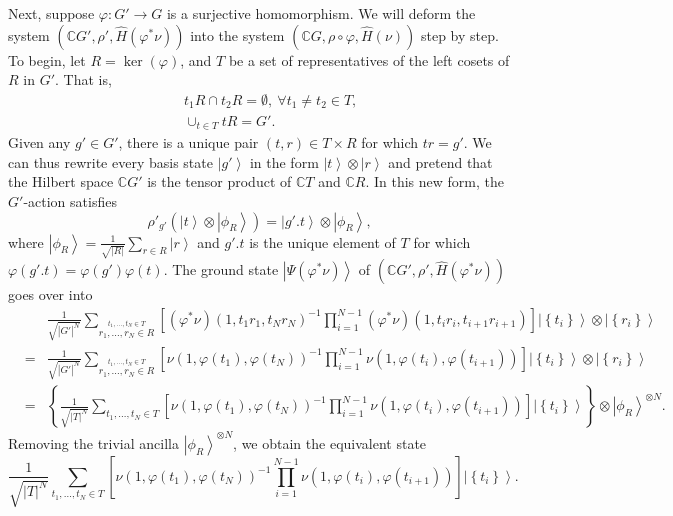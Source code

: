 \documentclass[sort&compress]{elsarticle}
\theoremstyle{theoremstyle}
\theoremstyle{framedtheoremstyle}
\theoremstyle{definitionstyle}
\theoremstyle{definitionstyle}
\theoremstyle{definitionstyle}
\theoremstyle{definitionstyle}
\theoremstyle{nameddefinitionstyle}
\theoremstyle{framednameddefinitionstyle}
\theoremstyle{proofstyle}
\theoremstyle{definitionstyle}
\newcommand{\fromto}{\rightarrow}
\newcommand{\CCC}{\mathbb{C}}
\DeclareMathOperator{\kernel}{ker}
\newcommand{\bars}[1]{\left| #1 \right|}
\newcommand{\paren}[1]{\left( #1 \right)}
\newcommand{\brackets}[1]{\left[ #1 \right]}
\newcommand{\braces}[1]{\left\{ #1 \right\}}
\newcommand{\ket}[1]{\left|#1\right\rangle}
\begin{document}
\begin{appendices}
Next, suppose $\varphi: G' \fromto G$ is a surjective homomorphism. We will deform the system $\paren{\CCC G', \rho', \hat H(\varphi^* \nu)}$ into the system $\paren{\CCC G, \rho\circ\varphi, \hat H(\nu)}$ step by step. To begin, let $R = \kernel(\varphi)$, and $T$ be a set of representatives of the left cosets of $R$ in $G'$. That is,
\begin{eqnarray}
&&t_1 R \cap t_2 R = \emptyset,~\forall t_1\neq t_2\in T, \\
&& \cup_{t\in T} t R = G'.
\end{eqnarray}
Given any $g'\in G'$, there is a unique pair $(t,r)\in T \times R$ for which $tr = g'$. We can thus rewrite every basis state $\ket {g'}$ in the form $\ket{t} \otimes \ket{r}$ and pretend that the Hilbert space $\CCC G'$ is the tensor product of $\CCC T$ and $\CCC R$. In this new form, the $G'$-action satisfies
\begin{equation}
\rho'_{g'} \paren{ \ket t \otimes \ket{\phi_R} } = \ket {g'.t} \otimes \ket{\phi_R},
\end{equation}
where $\ket{\phi_R} = \frac{1}{\sqrt{\bars R}} \sum_{r\in R} \ket r$ and $g'.t$ is the unique element of $T$ for which $\varphi(g'.t) = \varphi(g') \varphi(t)$. The ground state $\ket{\Psi(\varphi^* \nu)}$ of $\paren{ \CCC G', \rho', \hat H(\varphi^* \nu) }$ goes over into
\begin{eqnarray}
&& \frac{1}{ \sqrt{\bars{G'}^N} }
\sum_{ \stackrel{ t_1, \ldots, t_N\in T }{ r_1, \ldots, r_N \in R }}
\brackets{
\paren{\varphi^*\nu} \paren{ 1, t_1r_1, t_Nr_N }^{-1}
\prod_{i=1}^{N-1} \paren{\varphi^*\nu} \paren{ 1, t_ir_i, t_{i+1}r_{i+1} } 
}
\ket{ \braces{t_i} } \otimes \ket{ \braces{r_i} } \nonumber\\
&=& \frac{1}{ \sqrt{\bars{G'}^N} }
\sum_{ \stackrel{ t_1, \ldots, t_N\in T }{ r_1, \ldots, r_N \in R }}
\brackets{
\nu \paren{ 1, \varphi(t_1), \varphi(t_N) }^{-1}
\prod_{i=1}^{N-1} \nu \paren{ 1, \varphi(t_i), \varphi(t_{i+1}) } }
\ket{ \braces{t_i} } \otimes \ket{ \braces{r_i} } \nonumber\\
&=& \braces{
\frac{1}{ \sqrt{\bars{T}^N} }
\sum_{ t_1, \ldots, t_N\in T }
\brackets{
\nu \paren{ 1, \varphi(t_1), \varphi(t_N) }^{-1}
\prod_{i=1}^{N-1} \nu \paren{ 1, \varphi(t_i), \varphi(t_{i+1}) } 
}
\ket{ \braces{t_i} } } 
\otimes \ket{\phi_R}^{\otimes N}.
\end{eqnarray}
Removing the trivial ancilla $\ket{\phi_R}^{\otimes N}$, we obtain the equivalent state
\begin{equation}
\frac{1}{ \sqrt{\bars{T}^N} } \sum_{ t_1, \ldots, t_N\in T } \brackets{ \nu \paren{ 1, \varphi(t_1), \varphi(t_N) }^{-1} \prod_{i=1}^{N-1} \nu \paren{ 1, \varphi(t_i), \varphi(t_{i+1}) } } \ket{ \braces{t_i} }.

\end{equation}
\end{appendices}
\end{document}
